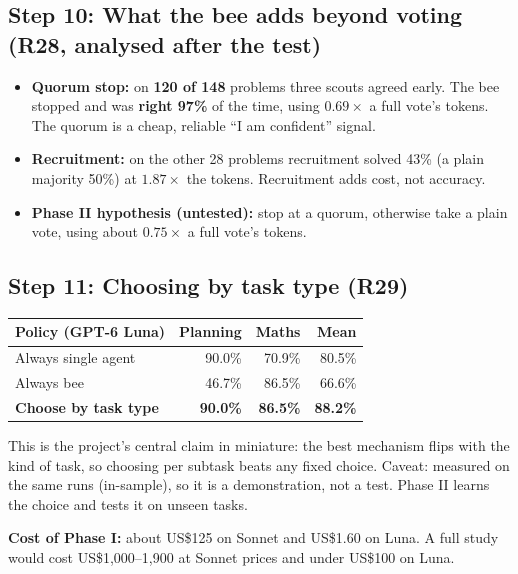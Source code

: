 \documentclass[11pt,a4paper]{article}
\begin{document}
\subsection*{Step 10: What the bee adds beyond voting (R28, analysed after the test)}
\begin{itemize}
  \item \textbf{Quorum stop:} on \textbf{120 of 148} problems three scouts agreed early. The bee stopped and
        was \textbf{right 97\%} of the time, using $0.69\times$ a full vote's tokens. The quorum is a cheap,
        reliable ``I am confident'' signal.
  \item \textbf{Recruitment:} on the other 28 problems recruitment solved 43\% (a plain majority 50\%) at
        $1.87\times$ the tokens. Recruitment adds cost, not accuracy.
  \item \textbf{Phase II hypothesis (untested):} stop at a quorum, otherwise take a plain vote, using about
        $0.75\times$ a full vote's tokens.
\end{itemize}

\subsection*{Step 11: Choosing by task type (R29)}
\begin{tabularx}{\linewidth}{@{}Lrrr@{}}
\toprule
\textbf{Policy (GPT-6 Luna)} & \textbf{Planning} & \textbf{Maths} & \textbf{Mean} \\
\midrule
Always single agent & 90.0\% & 70.9\% & 80.5\% \\
Always bee & 46.7\% & 86.5\% & 66.6\% \\
\textbf{Choose by task type} & \textbf{90.0\%} & \textbf{86.5\%} & \textbf{88.2\%} \\
\bottomrule
\end{tabularx}

This is the project's central claim in miniature: the best mechanism flips with the kind of task, so
choosing per subtask beats any fixed choice. Caveat: measured on the same runs (in-sample), so it is a
demonstration, not a test. Phase II learns the choice and tests it on unseen tasks.

\textbf{Cost of Phase I:} about US\$125 on Sonnet and US\$1.60 on Luna. A full study would cost
US\$1,000--1,900 at Sonnet prices and under US\$100 on Luna.
\end{document}
